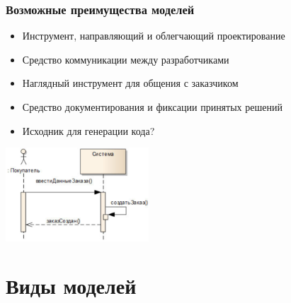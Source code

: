 \documentclass{../../slides-style}
\begin{document}
    \begin{frame}
        \frametitle{Возможные преимущества моделей}
        \begin{itemize}
            \item Инструмент, направляющий и облегчающий проектирование
            \item Средство коммуникации между разработчиками
            \item Наглядный инструмент для общения с заказчиком
            \item Средство документирования и фиксации принятых решений
            \item Исходник для генерации кода?
        \end{itemize}
        \begin{center}
            \includegraphics[width=0.4\textwidth]{sequenceDiagram.png}
        \end{center}
    \end{frame}

    \section{Виды моделей}
\end{document}
